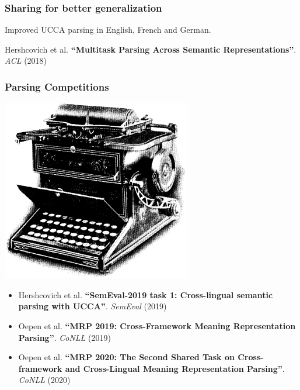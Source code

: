 \documentclass[t,xcolor={svgnames,table}]{beamer}
\begin{document}
\begin{frame}
    \frametitle{Sharing for better generalization}
    
    \begin{minipage}{.06\pagewidth}
    \scalebox{8}{\{}
    \end{minipage}
    \begin{minipage}{.27\pagewidth}
    \scalebox{.32}{\exucca}
    \end{minipage}
    \begin{minipage}{.22\pagewidth}
    \scalebox{.5}{\examr}
    \end{minipage}
    \begin{minipage}{.23\pagewidth}
    \scalebox{.5}{\exdm}
    \end{minipage}
    \begin{minipage}{.06\pagewidth}
    \scalebox{8}{\}}
    \end{minipage}
    
    \vfill
    \pause
    
    Improved UCCA parsing in English, French and German.
    
    \vfill
    
    Hershcovich et al. \textbf{``Multitask Parsing Across Semantic Representations''}. \textit{ACL} (2018)
\end{frame}
\begin{frame}
\frametitle{Parsing Competitions}
\begin{flushright}
\includegraphics[width=.1\textwidth]{type_writer2.png}
\end{flushright}
\begin{itemize}
\item Hershcovich et al. \textbf{``SemEval-2019 task 1: Cross-lingual semantic parsing with UCCA''}. \textit{SemEval} (2019)
\item Oepen et al. \textbf{``MRP 2019: Cross-Framework Meaning Representation Parsing''}. \textit{CoNLL} (2019)
\item Oepen et al. \textbf{``MRP 2020: The Second Shared Task on Cross-framework and Cross-Lingual Meaning Representation Parsing''}. \textit{CoNLL} (2020)
\end{itemize}
\end{frame}
\end{document}
